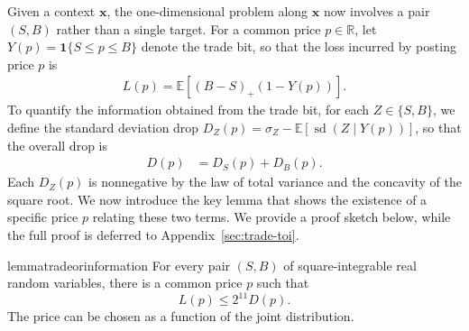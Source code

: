 \documentclass[11pt]{article}
\newcommand{\E}[1]{\mathbb E\left[#1\right]}
\newcommand{\R}{\mathbb R}
\DeclareMathOperator{\sd}{sd}
\newcommand{\bx}{\boldsymbol x}
\begin{document}
Given a context $\bx$, the one-dimensional problem along $\bx$ now involves a pair $(S,B)$ rather than a single target. For a common price $p\in\R$, {let} $Y(p)=\mathbf1\{S\le p\le B\}$ {denote }the trade bit, so that the loss incurred by posting price $p$ is
\begin{align}
 L(p)=\E{(B-S)_+(1-Y(p))}.\label{eq:trade-scalar-loss}
\end{align}
{To quantify the information obtained from the trade bit}, for each $Z \in \{S,B\}$, we define the standard deviation drop $D_Z(p)=\sigma_Z-\E{\sd(Z\mid Y(p))}$, so that the overall drop is
\begin{align}
    D(p)&=D_S(p)+D_B(p).\label{eq:trade-scalar-information}
\end{align}
Each $D_Z(p)$ is nonnegative by {the law of total variance and the concavity} of the square root. We now introduce the key lemma that shows the existence of a specific price $p$ relating these two terms. We provide a proof sketch below, while the full proof is deferred to Appendix~\ref{sec:trade-toi}.

\begin{restatable}{lemma}{tradeorinformation}\label{lem:toi}
For every pair $(S,B)$ of square-integrable real random variables, there is a common price $p$ such that
\begin{equation}\label{eq:toi}
 L(p)\le2^{11}D(p).
\end{equation}
The price can be chosen as a function of the joint distribution.
\end{restatable}
\end{document}
